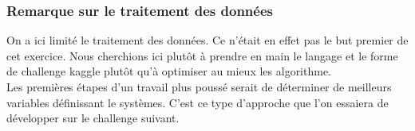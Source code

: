 \subsubsection{Remarque sur le traitement des données}

On a ici limité le traitement des données. Ce n'était en effet pas le but premier de cet exercice. Nous cherchions ici plutôt à prendre en main le langage et le forme de challenge kaggle plutôt qu'à optimiser au mieux les algorithme.\\

Les premières étapes d'un travail plus poussé serait de déterminer de meilleurs variables définissant le systèmes. C'est ce type d'approche que l'on essaiera de développer sur le challenge suivant.
